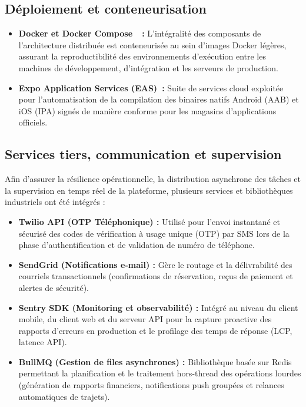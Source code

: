 \subsection{Déploiement et conteneurisation}

\begin{itemize}[leftmargin=1.8em]
  \item \textbf{Docker et Docker Compose~\cite{docker_docs}~:} L'intégralité des composants de l'architecture distribuée est conteneurisée au sein d'images Docker légères, assurant la reproductibilité des environnements d'exécution entre les machines de développement, d'intégration et les serveurs de production.
  \item \textbf{Expo Application Services (EAS)~:} Suite de services cloud exploitée pour l'automatisation de la compilation des binaires natifs Android (AAB) et iOS (IPA) signés de manière conforme pour les magasins d'applications officiels.
\end{itemize}

\subsection{Services tiers, communication et supervision}

Afin d'assurer la résilience opérationnelle, la distribution asynchrone des tâches et la supervision en temps réel de la plateforme, plusieurs services et bibliothèques industriels ont été intégrés :
\begin{itemize}[leftmargin=1.8em]
  \item \textbf{Twilio API (OTP Téléphonique) :} Utilisé pour l'envoi instantané et sécurisé des codes de vérification à usage unique (OTP) par SMS lors de la phase d'authentification et de validation de numéro de téléphone.
  \item \textbf{SendGrid (Notifications e-mail) :} Gère le routage et la délivrabilité des courriels transactionnels (confirmations de réservation, reçus de paiement et alertes de sécurité).
  \item \textbf{Sentry SDK (Monitoring et observabilité) :} Intégré au niveau du client mobile, du client web et du serveur API pour la capture proactive des rapports d'erreurs en production et le profilage des temps de réponse (LCP, latence API).
  \item \textbf{BullMQ (Gestion de files asynchrones) :} Bibliothèque basée sur Redis permettant la planification et le traitement hors-thread des opérations lourdes (génération de rapports financiers, notifications push groupées et relances automatiques de trajets).
\end{itemize}


